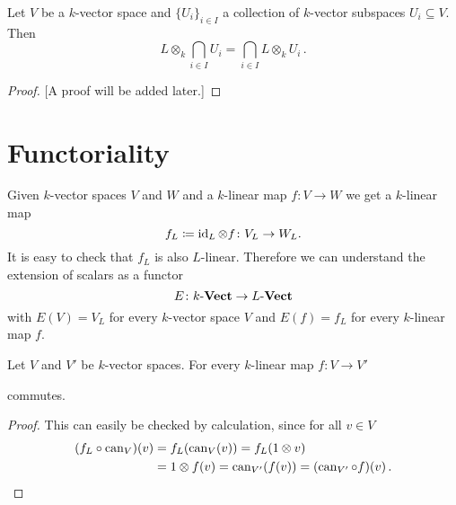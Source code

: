 \begin{lemma}
  Let $V$ be a $k$-vector space and $\{U_i\}_{i \in I}$ a collection of $k$-vector subspaces $U_i \subseteq V$.
  Then
  \[
      L \otimes_k \bigcap_{i \in I} U_i
    = \bigcap_{i \in I} L \otimes_k U_i \,.
  \]
\end{lemma}
\begin{proof}
  {[A proof will be added later.]}
\end{proof}





\section{Functoriality}


Given $k$-vector spaces $V$ and $W$ and a $k$-linear map $f \colon V \to W$ we get a $k$-linear map
\[
            f_L
  \coloneqq \operatorname{id}_L \otimes f
  \colon    V_L
  \to       W_L.
\]
It is easy to check that $f_L$ is also $L$-linear.
Therefore we can understand the extension of scalars as a functor
\[
  E \colon k\text{-}\mathbf{Vect} \to L\text{-}\mathbf{Vect}
\]
with $E(V) = V_L$ for every $k$-vector space $V$ and $E(f) = f_L$ for every $k$-linear map $f$. 

\begin{lemma}
  Let $V$ and $V'$ be $k$-vector spaces.
  For every $k$-linear map $f \colon V \to V'$
  \begin{center}
  \end{center}
  commutes.
\end{lemma}
\begin{proof}
  This can easily be checked by calculation, since for all $v \in V$
  \begin{align*}
        (f_L \circ \operatorname{can}_V)(v)
    &=  f_L(\operatorname{can}_V(v))
     =  f_L(1 \otimes v) \\
    &=  1 \otimes f(v)
     =  \operatorname{can}_{V'}(f(v))
     =  (\operatorname{can}_{V'} \circ f)(v) \,.
    \qedhere
  \end{align*}
\end{proof}


